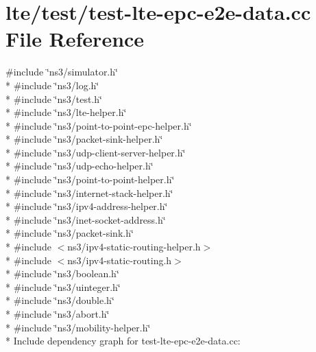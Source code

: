 \hypertarget{test-lte-epc-e2e-data_8cc}{}\section{lte/test/test-\/lte-\/epc-\/e2e-\/data.cc File Reference}
\label{test-lte-epc-e2e-data_8cc}
{\ttfamily \#include \char`\"{}ns3/simulator.\+h\char`\"{}}\\*
{\ttfamily \#include \char`\"{}ns3/log.\+h\char`\"{}}\\*
{\ttfamily \#include \char`\"{}ns3/test.\+h\char`\"{}}\\*
{\ttfamily \#include \char`\"{}ns3/lte-\/helper.\+h\char`\"{}}\\*
{\ttfamily \#include \char`\"{}ns3/point-\/to-\/point-\/epc-\/helper.\+h\char`\"{}}\\*
{\ttfamily \#include \char`\"{}ns3/packet-\/sink-\/helper.\+h\char`\"{}}\\*
{\ttfamily \#include \char`\"{}ns3/udp-\/client-\/server-\/helper.\+h\char`\"{}}\\*
{\ttfamily \#include \char`\"{}ns3/udp-\/echo-\/helper.\+h\char`\"{}}\\*
{\ttfamily \#include \char`\"{}ns3/point-\/to-\/point-\/helper.\+h\char`\"{}}\\*
{\ttfamily \#include \char`\"{}ns3/internet-\/stack-\/helper.\+h\char`\"{}}\\*
{\ttfamily \#include \char`\"{}ns3/ipv4-\/address-\/helper.\+h\char`\"{}}\\*
{\ttfamily \#include \char`\"{}ns3/inet-\/socket-\/address.\+h\char`\"{}}\\*
{\ttfamily \#include \char`\"{}ns3/packet-\/sink.\+h\char`\"{}}\\*
{\ttfamily \#include $<$ns3/ipv4-\/static-\/routing-\/helper.\+h$>$}\\*
{\ttfamily \#include $<$ns3/ipv4-\/static-\/routing.\+h$>$}\\*
{\ttfamily \#include \char`\"{}ns3/boolean.\+h\char`\"{}}\\*
{\ttfamily \#include \char`\"{}ns3/uinteger.\+h\char`\"{}}\\*
{\ttfamily \#include \char`\"{}ns3/double.\+h\char`\"{}}\\*
{\ttfamily \#include \char`\"{}ns3/abort.\+h\char`\"{}}\\*
{\ttfamily \#include \char`\"{}ns3/mobility-\/helper.\+h\char`\"{}}\\*
Include dependency graph for test-\/lte-\/epc-\/e2e-\/data.cc\+:
